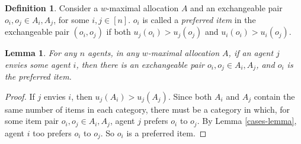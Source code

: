 \documentclass[sigconf]{aamas}
\newtheorem{lemma}[theorem]{Lemma}
\theoremstyle{definition}
\newtheorem{definition}[theorem]{Definition}
\begin{document}
\begin{definition}
\label{def:preffered}
Consider a $w$-maximal allocation $A$ and an exchangeable pair  $o_i, o_j\in A_i, A_j$, for some $i,j\in [n]$. 
$o_i$ is called a \textit{preferred item} in the exchangeable pair $(o_i,o_j)$ if both $u_j(o_i)>u_j(o_j)$ and $u_i(o_i)>u_i(o_j)$.
\end{definition}

\begin{lemma}
\label{lem:envy}
For any $n$ agents,
in any $w$-maximal allocation $A$,
if an agent $j$ envies some agent $i$,
then there is an exchangeable pair $o_i, o_j\in A_i, A_j$, 
and $o_i$ is the preferred item.
\end{lemma}
\begin{proof}
If $j$ envies $i$,
then $u_j(A_i)>u_j(A_j)$.
Since both $A_i$ and $A_j$ contain the same number of items in each category, there must be a category in which, for some item pair $o_i, o_j\in A_i, A_j$,
agent $j$ prefers $o_i$ to $o_j$.
By Lemma \ref{cases-lemma}, agent $i$ too prefers $o_i$ to $o_j$. So $o_i$ is a preferred item.
\end{proof}
\end{document}
